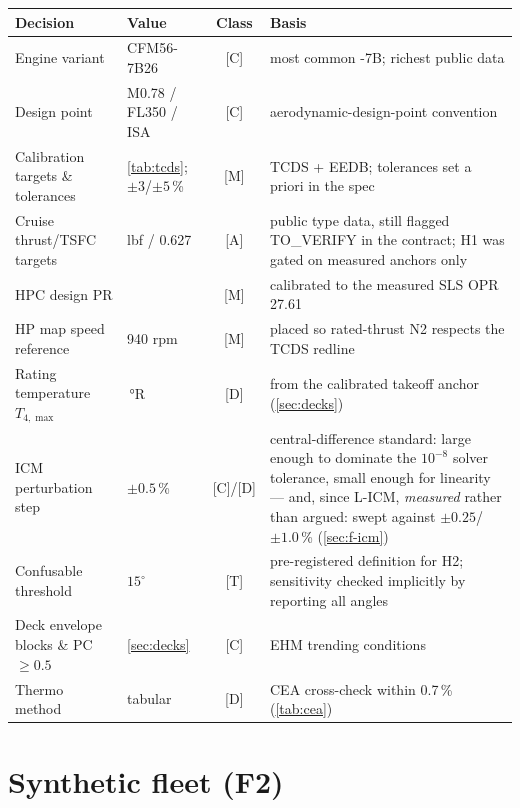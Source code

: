 \begin{center}\footnotesize\setlength{\tabcolsep}{4pt}
\begin{tabular}{>{\raggedright\arraybackslash}p{}>{\raggedright\arraybackslash}p{}c>{\raggedright\arraybackslash}p{}}
  \toprule
  Decision & Value & Class & Basis \\
  \midrule
  Engine variant & CFM56-7B26 & [C] & most common -7B; richest public data \\
  Design point & M0.78 / FL350 / ISA & [C] & aerodynamic-design-point convention \\
  Calibration targets \& tolerances & \cref{tab:tcds}; $\pm3$/$\pm5$\,\% & [M] & TCDS + EEDB; tolerances set a priori in the spec \\
  Cruise thrust/TSFC targets & 5480 lbf / 0.627 & [A] & public type data, still flagged
    TO\_VERIFY in the contract; H1 was gated on measured anchors only \\
  HPC design PR & 9.35 & [M] & calibrated to the measured SLS OPR 27.61 \\
  HP map speed reference & 13 940 rpm & [M] & placed so rated-thrust N2 respects the TCDS redline \\
  Rating temperature $T_{4,\max}$ & 3200\,°R & [D] & from the calibrated takeoff anchor (\cref{sec:decks}) \\
  ICM perturbation step & $\pm0.5$\,\% & [C]/[D] & central-difference standard: large enough to
    dominate the $10^{-8}$ solver tolerance, small enough for linearity --- and, since
    L-ICM, \emph{measured} rather than argued: swept against $\pm0.25$/$\pm1.0$\,\%
    (\cref{sec:f-icm}) \\
  Confusable threshold & $15^{\circ}$ & [T] & pre-registered definition for H2; sensitivity
    checked implicitly by reporting all angles \\
  Deck envelope blocks \& PC $\geq 0.5$ & \cref{sec:decks} & [C] & EHM trending conditions \\
  Thermo method & tabular & [D] & CEA cross-check within 0.7\,\% (\cref{tab:cea}) \\
  \bottomrule
\end{tabular}
\end{center}

\section*{Synthetic fleet (F2)}

